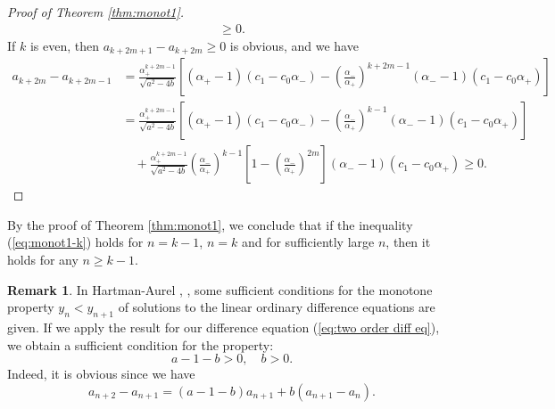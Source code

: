\documentclass[a4paper,11pt,reqno]{amsart}
\theoremstyle{plain}
\theoremstyle{definition}
\newtheorem{rmk}[thm]{Remark}
\begin{document}
\begin{proof}[Proof of Theorem \ref{thm:monot1}]
\begin{align*}
   \geq 0.
\end{align*}
If $k$ is even, then $a_{k+2m+1}-a_{k+2m}\geq 0$ is obvious, and we have 
\begin{align*}
a_{k+2m}-a_{k+2m-1}
   &=
   \frac{\alpha _{+}^{k+2m-1}}{\sqrt{a^{2}-4b}}
   \left[(\alpha _{+}-1)(c_{1}-c_{0}\alpha _{-})-\left(\frac{\alpha _{-}}{\alpha _{+}}\right)^{k+2m-1}(\alpha _{-}-1)(c_{1}-c_{0}\alpha _{+})\right] \\
   &=
   \frac{\alpha _{+}^{k+2m-1}}{\sqrt{a^{2}-4b}}
   \left[(\alpha _{+}-1)(c_{1}-c_{0}\alpha _{-})-\left(\frac{\alpha _{-}}{\alpha _{+}}\right)^{k-1}(\alpha _{-}-1)(c_{1}-c_{0}\alpha _{+})\right] \\
   & \quad +
   \frac{\alpha _{+}^{k+2m-1}}{\sqrt{a^{2}-4b}}
   \left(\frac{\alpha _{-}}{\alpha _{+}}\right)^{k-1}\left[1-\left(\frac{\alpha _{-}}{\alpha _{+}}\right)^{2m}\right](\alpha _{-}-1)(c_{1}-c_{0}\alpha _{+})
   \geq 0.
\end{align*}
\end{proof}
By the proof of Theorem \ref{thm:monot1}, we conclude that 
if the inequality (\ref{eq:monot1-k}) holds for $n=k-1$, $n=k$ and for sufficiently large $n$, 
then it holds for any $n \geq k-1$. 
\begin{rmk}
\label{rmk:Hartman-Aurel}
In Hartman-Aurel \cite{HA1}, \cite{HA2}, 
some sufficient conditions for the monotone property $y_{n}<y_{n+1}$ of solutions to 
the linear ordinary difference equations are given. 
If we apply the result for our difference equation (\ref{eq:two order diff eq}), 
we obtain a sufficient condition for the property: 
$$
a-1-b> 0, \quad b> 0 .
$$
Indeed, it is obvious since we have 
$$
a_{n+2}-a_{n+1}=(a-1-b)a_{n+1}+b(a_{n+1}-a_{n}). 
$$
\end{rmk}
\end{document}
